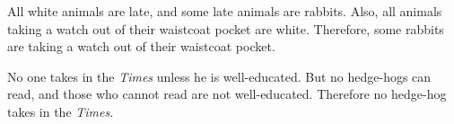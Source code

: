 {\begin{exercises}



\item All white animals are late, and some late animals are rabbits. Also, all animals taking a watch out of their waistcoat pocket are white. Therefore, some rabbits are taking a watch out of their waistcoat pocket.







\item \label{itm:hedgehogs} No one takes in the \textit{Times} unless he is well-educated. But no hedge-hogs can read, and those who cannot read are not well-educated. Therefore no hedge-hog takes in the \textit{Times}.


\end{exercises}}
